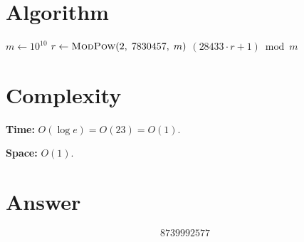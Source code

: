 \documentclass[12pt]{article}
\begin{document}
\section{Algorithm}

\begin{algorithm}[H]
\caption{Last ten digits of $28433 \times 2^{7830457} + 1$}
\begin{algorithmic}[1]
\STATE $m \gets 10^{10}$
\STATE $r \gets \textsc{ModPow}(2,\; 7830457,\; m)$ 
\RETURN $(28433 \cdot r + 1) \bmod m$
\end{algorithmic}
\end{algorithm}

\section{Complexity}

\textbf{Time:} $O(\log e) = O(23) = O(1)$.

\textbf{Space:} $O(1)$.

\section{Answer}

\[
\boxed{8739992577}
\]
\end{document}
